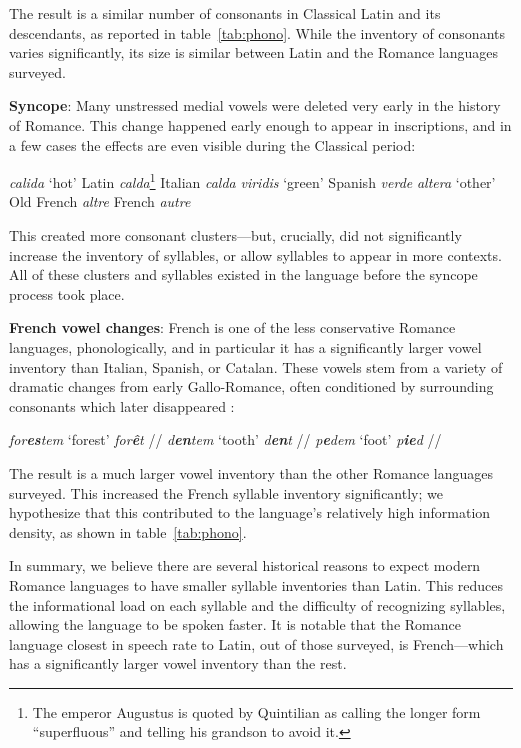 \documentclass[12pt,twoside]{article}
\newcommand{\ipa}[1]{/\textipa{#1}/}
\newcommand{\yields}{\textrightarrow}
\begin{document}
The result is a similar number of consonants in Classical Latin and its descendants, as reported in table~\ref{tab:phono}. While the inventory of consonants varies significantly, its size is similar between Latin and the Romance languages surveyed.

\textbf{Syncope}: Many unstressed medial vowels were deleted very early in the history of Romance. This change happened early enough to appear in inscriptions, and in a few cases the effects are even visible during the Classical period:

\begin{exe}
\ex \emph{calida} `hot' \yields{} Latin \emph{calda}\footnote{The emperor Augustus is quoted by Quintilian \citep[I.6.19]{quintilian} as calling the longer form ``superfluous'' and telling his grandson to avoid it.} \yields{} Italian \emph{calda}
\ex \emph{viridis} `green' \yields{} Spanish \emph{verde}
\ex \emph{altera} `other' \yields{} Old French \emph{altre} \yields{} French \emph{autre}
\end{exe}

This created more consonant clusters---but, crucially, did not significantly increase the inventory of syllables, or allow syllables to appear in more contexts. All of these clusters and syllables existed in the language before the syncope process took place.

\textbf{French vowel changes}: French is one of the less conservative Romance languages, phonologically, and in particular it has a significantly larger vowel inventory than Italian, Spanish, or Catalan. These vowels stem from a variety of dramatic changes from early Gallo-Romance, often conditioned by surrounding consonants which later disappeared \citep{pope,boyd}:

\begin{exe}
\ex \emph{for\textbf{es}tem} `forest' \yields{} \emph{for\textbf{\^e}t} \ipa{fOKE}
\ex \emph{d\textbf{en}tem} `tooth' \yields{} \emph{d\textbf{en}t} \ipa{d\~A}
\ex \emph{p\textbf{e}dem} `foot' \yields{} \emph{p\textbf{ie}d} \ipa{pje}
\end{exe}

The result is a much larger vowel inventory than the other Romance languages surveyed. This increased the French syllable inventory significantly; we hypothesize that this contributed to the language's relatively high information density, as shown in table~\ref{tab:phono}.

In summary, we believe there are several historical reasons to expect modern Romance languages to have smaller syllable inventories than Latin. This reduces the informational load on each syllable and the difficulty of recognizing syllables, allowing the language to be spoken faster. It is notable that the Romance language closest in speech rate to Latin, out of those surveyed, is French---which has a significantly larger vowel inventory than the rest.
\end{document}
